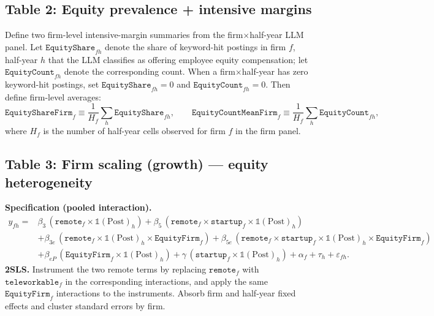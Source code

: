 \documentclass{article}
\newcommand{\cleanedresultsdir}{../../results/cleaned/tex}
\newcommand{\TableInput}[2][\linewidth]{}
\newcommand{\FloatNote}[1]{%
  \begingroup
    \captionsetup{style=noteflush}%
    \caption*{\textit{Notes:}~#1}%
  \endgroup
}
\begin{document}
\subsection*{Table 2: Equity prevalence + intensive margins}
\noindent Define two firm-level intensive-margin summaries from the firm$\times$half-year LLM panel. Let $\texttt{EquityShare}_{fh}$ denote the share of keyword-hit postings in firm $f$, half-year $h$ that the LLM classifies as offering employee equity compensation; let $\texttt{EquityCount}_{fh}$ denote the corresponding count. When a firm$\times$half-year has zero keyword-hit postings, set $\texttt{EquityShare}_{fh}=0$ and $\texttt{EquityCount}_{fh}=0$. Then define firm-level averages:
\[
  \texttt{EquityShareFirm}_f \equiv \frac{1}{H_f}\sum_h \texttt{EquityShare}_{fh},
  \qquad
  \texttt{EquityCountMeanFirm}_f \equiv \frac{1}{H_f}\sum_h \texttt{EquityCount}_{fh},
\]
where $H_f$ is the number of half-year cells observed for firm $f$ in the firm panel.
\begin{table}[H]\centering
  \caption{Anchor descriptives}
  \TableInput{\cleanedresultsdir/llm_equity_pi_followups_anchor_descriptives.tex}
  \FloatNote{Rows split firms into Startups vs Non-startups (startup defined as firm age $\leq 10$ as of 2020). ``Firms'' is the number of unique firms in the group. ``\% any equity'' is the share of firms in the group with $\texttt{EquityFirm}_f=1$. ``Mean share'' / ``Median share'' summarize $\texttt{EquityShareFirm}_f$; ``Mean count'' / ``Median count'' summarize $\texttt{EquityCountMeanFirm}_f$. These are unconditional firm-level moments under the coding rule described in Table 1.}
\end{table}

\subsection*{Table 3: Firm scaling (growth) --- equity heterogeneity}
\noindent \textbf{Specification (pooled interaction).}
\begin{equation*}
\begin{aligned}
  y_{fh} ={}&
  \beta_3\,(\texttt{remote}_f\times \mathds{1}(\text{Post})_h)
  + \beta_5\,(\texttt{remote}_f\times \texttt{startup}_f\times \mathds{1}(\text{Post})_h) \\
  &+ \beta_{3e}\,(\texttt{remote}_f\times \mathds{1}(\text{Post})_h\times \texttt{EquityFirm}_f)
  + \beta_{5e}\,(\texttt{remote}_f\times \texttt{startup}_f\times \mathds{1}(\text{Post})_h\times \texttt{EquityFirm}_f) \\
  &+ \beta_{eP}\,(\texttt{EquityFirm}_f\times \mathds{1}(\text{Post})_h)
  + \gamma\,(\texttt{startup}_f\times \mathds{1}(\text{Post})_h)
  + \alpha_f + \tau_h + \varepsilon_{fh}.
\end{aligned}
\end{equation*}
\noindent \textbf{2SLS.} Instrument the two remote terms by replacing $\texttt{remote}_f$ with $\texttt{teleworkable}_f$ in the corresponding interactions, and apply the same $\texttt{EquityFirm}_f$ interactions to the instruments. Absorb firm and half-year fixed effects and cluster standard errors by firm.
\end{document}
